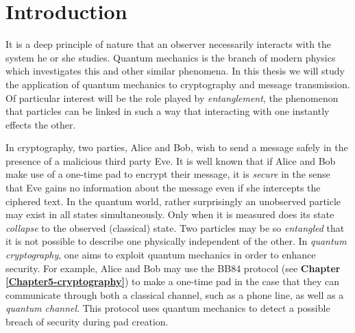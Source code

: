 
\chapter{Introduction} %

\label{Chapter1-introduction} %


\newcommand{\keyword}[1]{\textbf{#1}}
\newcommand{\tabhead}[1]{\textbf{#1}}
\newcommand{\code}[1]{\texttt{#1}}
\newcommand{\file}[1]{\texttt{\bfseries#1}}
\newcommand{\option}[1]{\texttt{\itshape#1}}




It is a deep principle of nature that an observer necessarily interacts with the system he or she studies. Quantum mechanics is the branch of modern physics which investigates this and other similar phenomena. In this thesis we will study the application of quantum mechanics to cryptography and message transmission. Of particular interest will be the role played by {\emph{entanglement}}, the phenomenon that particles can be linked in such a way that interacting with one instantly effects the other. 

In cryptography, two parties, Alice and Bob, wish to send a message safely in the presence of a malicious third party Eve. It is well known that if Alice and Bob make use of a one-time pad to encrypt their message, it is \emph{secure} in the sense that Eve gains no information about the message even if she intercepts the ciphered text. 
In the quantum world, rather surprisingly an unobserved particle may exist in all states simultaneously. Only when it is measured does its state {\emph{collapse}} to the observed (classical) state.  Two particles may be so {\emph{entangled}} that it is not possible to describe one physically independent of the other.  In {\emph{quantum cryptography}}, one aims to exploit quantum mechanics in order to enhance security. For example, Alice and Bob may use the BB84 protocol (see \textbf{Chapter \ref{Chapter5-cryptography}}) to make a one-time pad in the case that they can communicate through both a classical channel, such as a phone line, as well as a \textit{quantum channel}. This protocol uses quantum mechanics to detect a possible breach of security during pad creation.  



